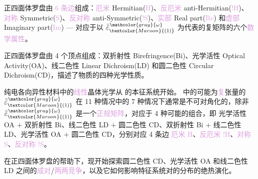 \textcolor{NavyBlue}{正四面体罗盘}由 \textcolor{Plum}{6 条边}组成：\textcolor{Plum}{厄米} Hermitian(\textcolor{Plum}{H})、\textcolor{Plum}{反厄米} anti-Hermitian(\textcolor{Plum}{$!$H})、\textcolor{Plum}{对称} Symmetric(\textcolor{Plum}{S})、\textcolor{Plum}{反对称} anti-Symmetric(\textcolor{Plum}{$!$S})、\textcolor{Plum}{实部} Real part(\textcolor{Plum}{Re}) 和\textcolor{Plum}{虚部} Imaginary part(\textcolor{Plum}{Im}) --- 对应于以 $\bar{\bar{\varepsilon}}^{\;\! \mathcolor{gray}{\omega}}_{\textcolor{Maroon}{(1)}}$ 为代表的复矩阵的六个\textcolor{Plum}{数学属性}。

\textcolor{NavyBlue}{正四面体罗盘}由 \textcolor{NavyBlue}{4 个顶点}组成：\textcolor{NavyBlue}{双折射性} Birefringence(\textcolor{NavyBlue}{Bi})、\textcolor{NavyBlue}{光学活性} Optical Activity(\textcolor{NavyBlue}{OA})、\textcolor{NavyBlue}{线二色性} Linear Dichroism(\textcolor{NavyBlue}{LD}) 和\textcolor{NavyBlue}{圆二色性} Circular Dichroism(\textcolor{NavyBlue}{CD})，描述了物质的四种\textcolor{NavyBlue}{光学性质}。

\textcolor{PineGreen}{纯电各向异性}材料中的\textcolor{Plum}{线性}\textcolor{PineGreen}{晶体光学}从  的\textcolor{PineGreen}{本征系统}开始。 中的可能为\textcolor{Plum}{复}张量的 $\bar{\bar{\varepsilon}}^{\;\! \mathcolor{gray}{\omega}}_{\textcolor{Maroon}{(1)}}$ 在 11 种情况中的 7 种情况下通常是不可对角化的，除非 $\bar{\bar{\varepsilon}}^{\;\! \mathcolor{gray}{\omega}}_{\textcolor{Maroon}{(1)}}$ 是一个\textcolor{Plum}{正规矩阵}，对应于 4 种可能的组合，即 \textcolor{NavyBlue}{光学活性 OA} $+$ \textcolor{NavyBlue}{双折射性 Bi}、\textcolor{NavyBlue}{线二色性 LD} $+$ \textcolor{NavyBlue}{圆二色性 CD}、\textcolor{NavyBlue}{双折射性 Bi} $+$ \textcolor{NavyBlue}{线二色性 LD}、\textcolor{NavyBlue}{光学活性 OA} $+$ \textcolor{NavyBlue}{圆二色性 CD}，分别对应 4 条边 \textcolor{Plum}{厄米 H}、\textcolor{Plum}{反厄米 $!$H}、\textcolor{Plum}{对称 S}、\textcolor{Plum}{反对称 $!$S}。

在\textcolor{NavyBlue}{正四面体罗盘}的帮助下，现开始探索\textcolor{NavyBlue}{圆二色性 CD}、\textcolor{NavyBlue}{光学活性 OA} 和\textcolor{NavyBlue}{线二色性 LD} 之间的\textcolor{Plum}{成对}/\textcolor{Plum}{两两竞争}，以及它如何影响\textcolor{PineGreen}{特征系统}对的分布的\textcolor{NavyBlue}{绝热演化}。

